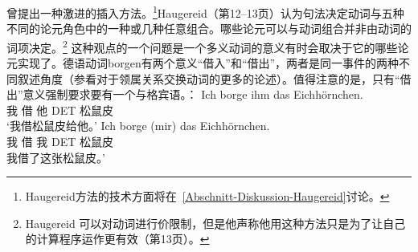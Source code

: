 \begin{exe}
\begin{xlist}[iv.]
\begin{exe}
\begin{xlist}[iv.]
\citet{Haugereid2009a}曾提出一种激进的插入方法。\footnote{
  Haugereid方法的技术方面将在~\ref{Abschnitt-Diskussion-Haugereid}讨论。
}Haugereid（第12--13页）认为句法决定动词与五种不同的论元角色中的一种或几种任意组合。哪些论元可以与动词组合并非由动词的词项决定。\footnote{ 
  Haugereid 可以对动词进行价限制，但是他声称他用这种方法只是为了让自己的计算程序运作更有效（第13页）。
}
这种观点的一个问题是一个多义动词的意义有时会取决于它的哪些论元实现了。德语动词borgen有两个意义“借入”和“借出”，两者是同一事件的两种不同叙述角度（参看对于领属关系交换动词的更多的论述）。值得注意的是，只有“借出”意义强制要求要有一个与格宾语。\citep[]{MuellerGTBuch1}：
\eal
\ex 
\gll Ich borge ihm das Eichhörnchen.\\
     我   借  他 DET 松鼠皮\\
\glt `我借松鼠皮给他。'
\ex 
\gll Ich borge (mir) das Eichhörnchen.\\
     我 借 我 DET 松鼠皮\\
\glt 我借了这张松鼠皮。'

\end{xlist}
\end{exe}
\end{xlist}
\end{exe}
